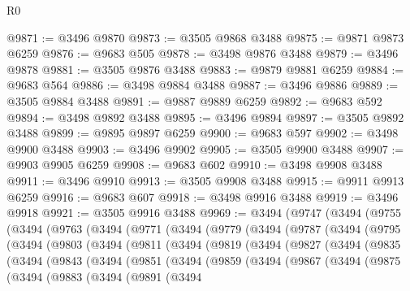 \begin{lexlean}{R0}
\begin{coremodule}
@9871 := @3496 @9870
@9873 := @3505 @9868 @3488
@9875 := @9871 @9873 @6259
@9876 := @9683 @505
@9878 := @3498 @9876 @3488
@9879 := @3496 @9878
@9881 := @3505 @9876 @3488
@9883 := @9879 @9881 @6259
@9884 := @9683 @564
@9886 := @3498 @9884 @3488
@9887 := @3496 @9886
@9889 := @3505 @9884 @3488
@9891 := @9887 @9889 @6259
@9892 := @9683 @592
@9894 := @3498 @9892 @3488
@9895 := @3496 @9894
@9897 := @3505 @9892 @3488
@9899 := @9895 @9897 @6259
@9900 := @9683 @597
@9902 := @3498 @9900 @3488
@9903 := @3496 @9902
@9905 := @3505 @9900 @3488
@9907 := @9903 @9905 @6259
@9908 := @9683 @602
@9910 := @3498 @9908 @3488
@9911 := @3496 @9910
@9913 := @3505 @9908 @3488
@9915 := @9911 @9913 @6259
@9916 := @9683 @607
@9918 := @3498 @9916 @3488
@9919 := @3496 @9918
@9921 := @3505 @9916 @3488
@9969 := @3494
    (@9747
      (@3494
        (@9755
          (@3494
            (@9763
              (@3494
                (@9771
                  (@3494
                    (@9779
                      (@3494
                        (@9787
                          (@3494
                            (@9795
                              (@3494
                                (@9803
                                  (@3494
                                    (@9811
                                      (@3494
                                        (@9819
                                          (@3494
                                            (@9827
                                              (@3494
                                                (@9835
                                                  (@3494
                                                    (@9843
                                                      (@3494
                                                        (@9851
                                                          (@3494
                                                            (@9859
                                                              (@3494
                                                                (@9867
                                                                  (@3494
                                                                    (@9875
                                                                      (@3494
                                                                        (@9883
                                                                          (@3494
                                                                            (@9891
                                                                              (@3494

\end{coremodule}
\end{lexlean}
